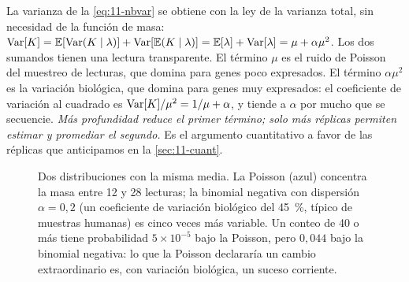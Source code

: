 La varianza de la \cref{eq:11-nbvar} se obtiene con la ley de la varianza total, sin necesidad de la función de masa: $\operatorname{Var}[K]=\mathbb{E}[\operatorname{Var}(K\mid\lambda)]+\operatorname{Var}[\mathbb{E}(K\mid\lambda)]=\mathbb{E}[\lambda]+\operatorname{Var}[\lambda]=\mu+\alpha\mu^2$. Los dos sumandos tienen una lectura transparente. El término $\mu$ es el ruido de Poisson del muestreo de lecturas, que domina para genes poco expresados. El término $\alpha\mu^2$ es la variación biológica, que domina para genes muy expresados: el coeficiente de variación al cuadrado es $\operatorname{Var}[K]/\mu^2=1/\mu+\alpha$, y tiende a $\alpha$ por mucho que se secuencie. \emph{Más profundidad reduce el primer término; solo más réplicas permiten estimar y promediar el segundo.} Es el argumento cuantitativo a favor de las réplicas que anticipamos en la \cref{sec:11-cuant}.

\begin{figure}[t]
\centering
{}
\caption[Poisson frente a binomial negativa]{Dos distribuciones con la misma media. La Poisson (azul) concentra la masa entre 12 y 28 lecturas; la binomial negativa con dispersión $\alpha=0{,}2$ (un coeficiente de variación biológico del \SI{45}{\percent}, típico de muestras humanas) es cinco veces más variable. Un conteo de 40 o más tiene probabilidad $5\times10^{-5}$ bajo la Poisson, pero $0{,}044$ bajo la binomial negativa: lo que la Poisson declararía un cambio extraordinario es, con variación biológica, un suceso corriente.}
\label{fig:11-pmf}
\end{figure}

